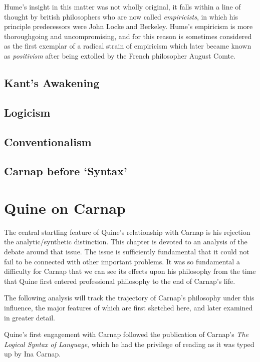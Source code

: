Hume's insight in this matter was not wholly original, it falls within a line of thought by british philosophers who are now called {\it empiricists}, in which his principle predecessors were John Locke and Berkeley.
Hume's empiricism is more thoroughgoing and uncompromising, and for this reason is sometimes considered as the first exemplar of a radical strain of empiricism which later became known as {\it positivism} after being extolled by the French philosopher August Comte.



\section{Kant's Awakening}

\section{Logicism}

\section{Conventionalism}

\section{Carnap before `Syntax'}

\chapter{Quine on Carnap}

\nocite{carnap56,carnap63,copi67,quine53,quine61, quine61a,quine66,quine86}

The central startling feature of Quine's relationship with
Carnap is his rejection the analytic/synthetic distinction.
This chapter is devoted to an analysis of the debate around
that issue.
The issue is sufficiently fundamental that it could not fail
to be connected with other important problems.
It was so fundamental a difficulty for Carnap that we can
see its effects upon his philosophy from the time that Quine
first entered professional philosophy to the end of Carnap's
life.

The following analysis will track the trajectory of Carnap's
philosophy under this influence, the major features of which
are first sketched here, and later examined in greater detail.

Quine's first engagement with Carnap followed the publication
of Carnap's {\it The Logical Syntax of Language}\cite{carnap37},
which he had the privilege of reading as it was typed up by
Ina Carnap.

